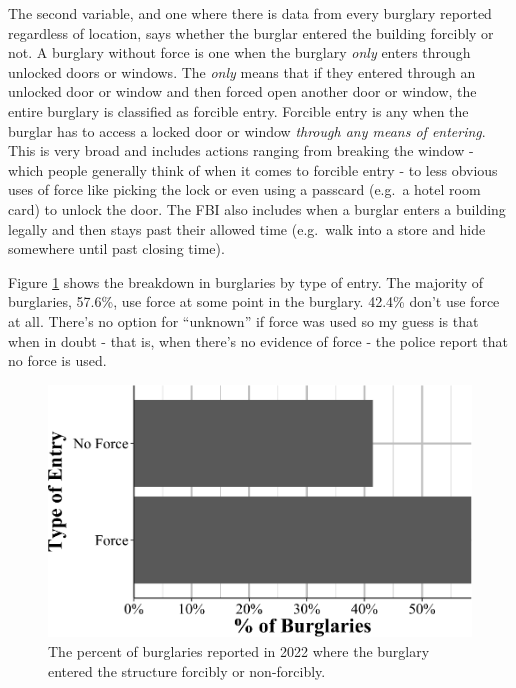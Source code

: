 \documentclass[
  12pt,
  openany]{book}
\begin{document}
The second variable, and one where there is data from every burglary reported regardless of location, says whether the burglar entered the building forcibly or not. A burglary without force is one when the burglary \emph{only} enters through unlocked doors or windows. The \emph{only} means that if they entered through an unlocked door or window and then forced open another door or window, the entire burglary is classified as forcible entry. Forcible entry is any when the burglar has to access a locked door or window \emph{through any means of entering}. This is very broad and includes actions ranging from breaking the window - which people generally think of when it comes to forcible entry - to less obvious uses of force like picking the lock or even using a passcard (e.g.~a hotel room card) to unlock the door. The FBI also includes when a burglar enters a building legally and then stays past their allowed time (e.g.~walk into a store and hide somewhere until past closing time).

Figure \ref{fig:offensesTypeOfEntry} shows the breakdown in burglaries by type of entry. The majority of burglaries, 57.6\%, use force at some point in the burglary. 42.4\% don't use force at all. There's no option for ``unknown'' if force was used so my guess is that when in doubt - that is, when there's no evidence of force - the police report that no force is used.

\begin{figure}

{\centering \includegraphics[width=0.9\linewidth]{13_nibrs_offense_files/figure-latex/offensesTypeOfEntry-1} 

}

\caption{The percent of burglaries reported in 2022 where the burglary entered the structure forcibly or non-forcibly.}\label{fig:offensesTypeOfEntry}
\end{figure}
\end{document}
